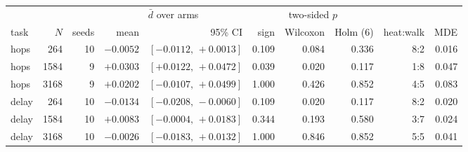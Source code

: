 {\footnotesize\setlength{\tabcolsep}{3.5pt}
\begin{tabular}{@{}lrrrrrrrrr@{}}
\toprule
& & & \multicolumn{2}{c}{$\bar d$ over arms} & \multicolumn{3}{c}{two-sided $p$} & & \\
\cmidrule(lr){4-5}\cmidrule(lr){6-8}
task & $N$ & seeds & mean & 95\% CI & sign & Wilcoxon & Holm (6) & heat:walk & MDE \\
\midrule
hops & 264 & 10 & $-0.0052$ & $[-0.0112,\,+0.0013]$ & 0.109 & 0.084 & 0.336 & 8:2 & 0.016 \\
hops & 1584 & 9 & $+0.0303$ & $[+0.0122,\,+0.0472]$ & 0.039 & 0.020 & 0.117 & 1:8 & 0.047 \\
hops & 3168 & 9 & $+0.0202$ & $[-0.0107,\,+0.0499]$ & 1.000 & 0.426 & 0.852 & 4:5 & 0.083 \\
delay & 264 & 10 & $-0.0134$ & $[-0.0208,\,-0.0060]$ & 0.109 & 0.020 & 0.117 & 8:2 & 0.020 \\
delay & 1584 & 10 & $+0.0083$ & $[-0.0004,\,+0.0183]$ & 0.344 & 0.193 & 0.580 & 3:7 & 0.024 \\
delay & 3168 & 10 & $-0.0026$ & $[-0.0183,\,+0.0132]$ & 1.000 & 0.846 & 0.852 & 5:5 & 0.041 \\
\bottomrule
\end{tabular}
}
